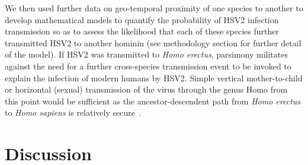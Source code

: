 \documentclass[fleqn,10pt]{wlscirep}
\begin{document}
We then used further data on geo-temporal proximity of one species to another to develop mathematical models to quantify the probability of HSV2 infection transmission so as to assess the likelihood that each of these species further transmitted HSV2 to another hominin (see methodology section for further detail of the model). If HSV2 was transmitted to \textit{Homo erectus}, parsimony militates against the need for a further cross-species transmission event to be invoked to explain the infection of modern humans by HSV2. Simple vertical mother-to-child or horizontal (sexual) transmission of the virus through the genus Homo from this point would be sufficient as the ancestor-descendent path from \textit{Homo erectus} to \textit{Homo sapiens} is relatively secure~\citep{Maslin2015}.

\section*{Discussion}
\end{document}
